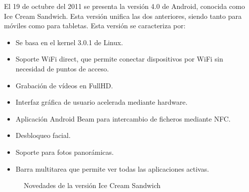 El 19 de octubre del 2011 se presenta la versión 4.0 de Android, conocida como Ice Cream Sandwich. Esta versión unifica las dos anteriores, siendo tanto para móviles como para tabletas. Esta versión se caracteriza por:
\begin{itemize}
\item Se basa en el kernel 3.0.1 de Linux.
\item Soporte WiFi direct, que permite conectar dispositivos por WiFi sin necesidad de puntos de acceso.
\item Grabación de vídeos en FullHD.
\item Interfaz gráfica de usuario acelerada mediante hardware.
\item Aplicación Android Beam para intercambio de ficheros mediante NFC.
\item Desbloqueo facial.
\item Soporte para fotos panorámicas.
\item Barra multitarea que permite ver todas las aplicaciones activas.
\end{itemize}

\begin{figure}[!h]
	\centering	
	\hspace{0.8cm}
	\caption{Novedades de la versión Ice Cream Sandwich}
\end{figure}


